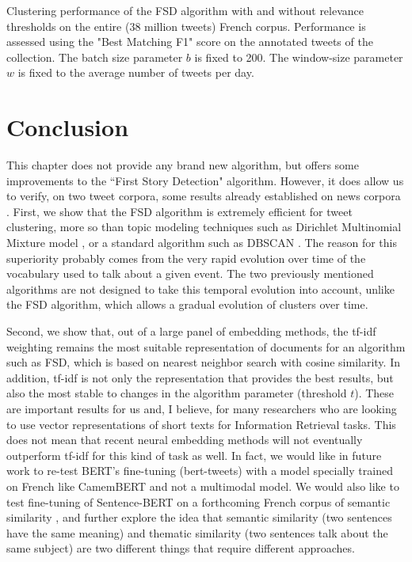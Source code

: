 \begin{table}[ht]
\begin{center}


\caption[Clustering performance of the FSD algorithm with and without relevance thresholds on the entire corpus]{Clustering performance of the FSD algorithm with and without relevance thresholds on the entire (38 million tweets) French corpus. Performance is assessed using the "Best Matching F1" score on the annotated tweets of the collection. The batch size parameter $b$ is fixed to 200. The window-size parameter $w$ is fixed to the average number of tweets per day.} \label{Tab: FSD_thresholds}
\end{center}
\end{table}


\section{Conclusion}

This chapter does not provide any brand new algorithm, but offers some improvements to the ``First Story Detection" algorithm. However, it does allow us to verify, on two tweet corpora, some results already established on news corpora \citep{cage2020production}. First, we show that the FSD algorithm is extremely efficient for tweet clustering, more so than topic modeling techniques such as Dirichlet Multinomial Mixture model \citep{yin_dirichlet_2014}, or a standard algorithm such as DBSCAN \citep{ester1996density}.  The reason for this superiority probably comes from the very rapid evolution over time of the vocabulary used to talk about a given event. The two previously mentioned algorithms are not designed to take this temporal evolution into account, unlike the FSD algorithm, which allows a gradual evolution of clusters over time.

Second, we show that, out of a large panel of embedding methods, the tf-idf weighting remains the most suitable representation of documents for an algorithm such as FSD, which is based on nearest neighbor search with cosine similarity. In addition, tf-idf is not only the representation that provides the best results, but also the most stable to changes in the algorithm parameter (threshold $t$). These are important results for us and, I believe, for many researchers who are looking to use vector representations of short texts for Information Retrieval tasks. This does not mean that recent neural embedding methods will not eventually outperform tf-idf for this kind of task as well. In fact, we would like in future work to re-test BERT's fine-tuning (bert-tweets) with a model specially trained on French like CamemBERT \citep{martin2020camembert} and not a multimodal model. We would also like to test fine-tuning of Sentence-BERT on a forthcoming French corpus of semantic similarity \citep{cardon2020french}, and further explore the idea that semantic similarity (two sentences have the same meaning) and thematic similarity (two sentences talk about the same subject) are two different things that require different approaches.

